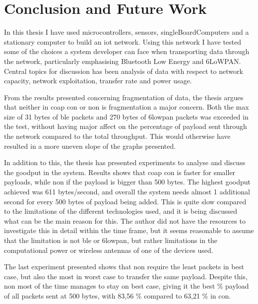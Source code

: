 \chapter{Conclusion and Future Work}
\label{chp:results}



\noindent In this thesis I have used \glspl{microcontroller}, sensors, \glspl{singleBoardComputer} and a stationary computer to build an \gls{iot} network. Using this network I have tested some of the choices a system developer can face when transporting data through the network, particularly emphasising Bluetooth Low Energy and 6LoWPAN. Central topics for discussion has been analysis of data with respect to network capacity, network exploitation, transfer rate and power usage. 

\noindent From the results presented concerning fragmentation of data, the thesis argues that neither in \gls{coap} \gls{con} or \gls{non} is fragmentation a major concern. Both the max size of 31 bytes of \gls{ble} packets and 270 bytes of \gls{6lowpan} packets was exceeded in the test, without having major affect on the percentage of \gls{payload} sent through the network compared to the total \gls{throughput}. This would otherwise have resulted in a more uneven slope of the graphs presented. 

\noindent In addition to this, the thesis has presented experiments to analyse and discuss the \gls{goodput} in the system. Results shows that \gls{coap} \gls{con} is faster for smaller \glspl{payload}, while \gls{non} if the \gls{payload} is bigger than 500 bytes. The highest \gls{goodput} achieved was 611 bytes/second, and overall the system needs almost 1 additional second for every 500 bytes of \gls{payload} being added. This is quite slow compared to the limitations of the different technologies used, and it is being discussed what can be the main reason for this. The author did not have the resources to investigate this in detail within the time frame, but it seems reasonable to assume that the limitation is not \gls{ble} or \gls{6lowpan}, but rather limitations in the computational power or wireless antennas of one of the devices used. 

\noindent The last experiment presented shows that \gls{non} require the least packets in best case, but also the most in worst case to transfer the same \gls{payload}. Despite this, \gls{non} most of the time manages to stay on best case, giving it the best \% payload of all packets sent at 500 bytes, with 83,56 \% compared to 63,21 \% in \gls{con}.

